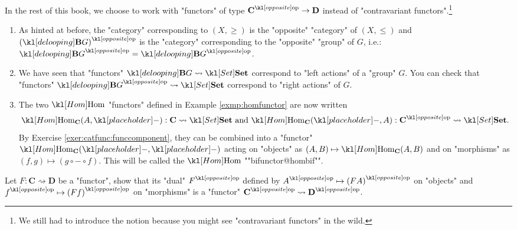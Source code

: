 \documentclass[main.tex]{subfiles}
\begin{document}
In the rest of this book, we choose to work with "functors" of type $\op{\mathbf{C}} \rightarrow \mathbf{D}$ instead of "contravariant functors".\footnote{We still had to introduce the notion because you might see "contravariant functors" in the wild.}
\begin{exmps}
	\begin{enumerate}
		\item  As hinted at before, the "category" corresponding to $(X, \geq)$ is the "opposite" "category" of $(X, \leq)$ and $\op{(\deloop{G})}$ is the "category" corresponding to the "opposite" "group" of $G$, i.e.: $\op{\deloop{G}}= \deloop{\op{G}}$.

	\item We have seen that "functors" $\deloop{G} \rightsquigarrow \catSet$ correspond to "left actions" of a "group" $G$. You can check that "functors" $\op{\deloop{G}} \rightsquigarrow \catSet$ correspond to "right actions" of $G$.
	
	\item The two $\Hom$ "functors" defined in Example \ref{exmp:homfunctor} are now written 
	\[\Hom_{\mathbf{C}}(A, \placeholder): \mathbf{C} \rightsquigarrow \catSet \text{ and } \Hom_{\mathbf{C}}(\placeholder,A) : \op{\mathbf{C}} \rightsquigarrow \catSet.\]
	By Exercise \ref{exer:catfunc:funccomponent}, they can be combined into a "functor" $\Hom_{\mathbf{C}}(\placeholder,\placeholder)$ acting on "objects" as $(A,B) \mapsto \Hom_{\mathbf{C}}(A,B)$ and on "morphisms" as $(f,g) \mapsto (g \circ - \circ f)$. This will be called the $\Hom$ ""bifunctor@hombif"".
\end{enumerate}
\end{exmps}
\begin{exer}[\NOW]%
	Let $F: \mathbf{C} \rightsquigarrow \mathbf{D}$ be a "functor", show that its "dual" $\op{F}$ defined by $\op{A} \mapsto \op{(FA)}$ on "objects" and $\op{f} \mapsto \op{(Ff)}$ on "morphisms" is a "functor" $\op{\mathbf{C}} \rightsquigarrow \op{\mathbf{D}}$. 
\end{exer}
\end{document}
